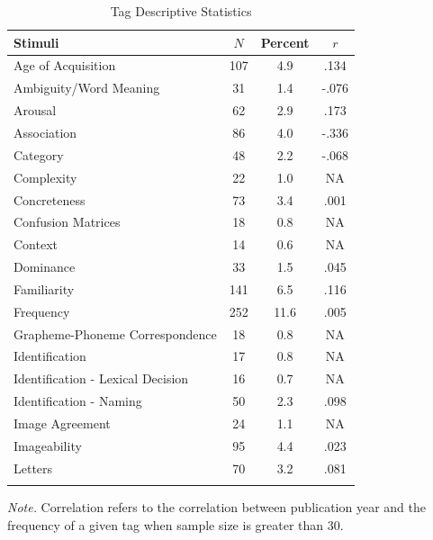 \documentclass[english,,man]{apa6}
\theoremstyle{definition}
\theoremstyle{definition}
\theoremstyle{definition}
\theoremstyle{remark}
\begin{document}
\begin{table}[tbp]
\begin{center}
\begin{threeparttable}
\caption{\label{tab:tag-table}Tag Descriptive Statistics}
\small{
\begin{tabular}{lccc}
\toprule
Stimuli & $N$ & Percent & $r$\\
\midrule
Age of Acquisition & 107 & 4.9 & .134\\
Ambiguity/Word Meaning & 31 & 1.4 & -.076\\
Arousal & 62 & 2.9 & .173\\
Association & 86 & 4.0 & -.336\\
Category & 48 & 2.2 & -.068\\
Complexity & 22 & 1.0 & NA\\
Concreteness & 73 & 3.4 & .001\\
Confusion Matrices & 18 & 0.8 & NA\\
Context & 14 & 0.6 & NA\\
Dominance & 33 & 1.5 & .045\\
Familiarity & 141 & 6.5 & .116\\
Frequency & 252 & 11.6 & .005\\
Grapheme-Phoneme Correspondence & 18 & 0.8 & NA\\
Identification & 17 & 0.8 & NA\\
Identification - Lexical Decision & 16 & 0.7 & NA\\
Identification - Naming & 50 & 2.3 & .098\\
Image Agreement & 24 & 1.1 & NA\\
Imageability & 95 & 4.4 & .023\\
Letters & 70 & 3.2 & .081\\
\bottomrule
\addlinespace
\end{tabular}
}
\begin{tablenotes}[para]
\normalsize{\textit{Note.} Correlation refers to the correlation between publication year and the frequency of a given tag when sample size is greater than 30.}
\end{tablenotes}
\end{threeparttable}
\end{center}
\end{table}
\end{document}

